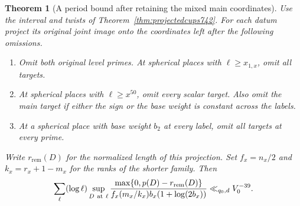 \documentclass[a4paper,11pt]{article}
\newtheorem{theorem}[proposition]{Theorem}
\theoremstyle{definition}
\theoremstyle{remark}
\numberwithin{equation}{section}
\begin{document}
\begin{theorem}[A period bound after retaining the mixed main coordinates]
\leavevmode\label{thm:remainingmain771}
Use the interval and twists of Theorem~\ref{thm:projectedcups742}.
For each datum project its original joint image onto the
coordinates left after the following omissions.
\begin{enumerate}
\item Omit both original level primes. At spherical places
with \(\ell\ge x_{1,x}\), omit all targets.
\item At spherical places with \(\ell\ge x^{50}\), omit
every scalar target. Also omit the main target if either
the sign or the base weight is constant across the labels.
\item At a spherical place with base weight \(b_2\) at
every label, omit all targets at every prime.
\end{enumerate}
Write \(r_{\mathrm{rem}}(D)\) for the normalized length of
this projection. Set \(f_x=n_x/2\) and \(k_x=r_x+1-m_x\)
for the ranks of the shorter family. Then
\[
 \sum_\ell(\log\ell)\sup_{D\ {\rm at}\ \ell}
   \frac{\max\{0,p(D)-r_{\mathrm{rem}}(D)\}}
        {f_x(m_x/k_x)b_x(1+\log(2b_x))}
     \ll_{q_0,d} V_0^{-39}.
\]
\end{theorem}
\end{document}
